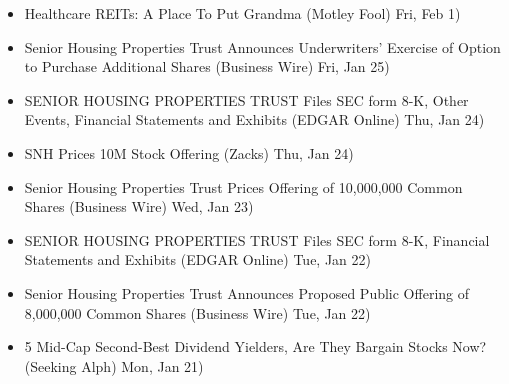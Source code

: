 \documentclass[11pt,asymmetric]{article}
\begin{document}
\begin{itemize}
\item Healthcare REITs: A Place To Put Grandma (Motley Fool) Fri, Feb 1)
\item Senior Housing Properties Trust Announces Underwriters' Exercise of Option to Purchase Additional Shares (Business Wire) Fri, Jan 25)
\item SENIOR HOUSING PROPERTIES TRUST Files SEC form 8-K, Other Events, Financial Statements and Exhibits (EDGAR Online) Thu, Jan 24)
\item SNH Prices 10M Stock Offering (Zacks) Thu, Jan 24)
\item Senior Housing Properties Trust Prices Offering of 10,000,000 Common Shares (Business Wire) Wed, Jan 23)
\item SENIOR HOUSING PROPERTIES TRUST Files SEC form 8-K, Financial Statements and Exhibits (EDGAR Online) Tue, Jan 22)
\item Senior Housing Properties Trust Announces Proposed Public Offering of 8,000,000 Common Shares (Business Wire) Tue, Jan 22)
\item 5 Mid-Cap Second-Best Dividend Yielders, Are They Bargain Stocks Now? (Seeking Alph) Mon, Jan 21)
\end{itemize}
\end{document}
